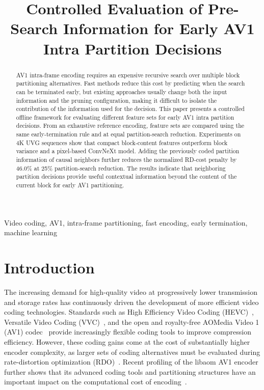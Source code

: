 \documentclass{article}
\title{Controlled Evaluation of Pre-Search Information for Early AV1 Intra Partition Decisions}
\begin{document}
\ninept

\maketitle

\begin{abstract}
AV1 intra-frame encoding requires an expensive recursive search over multiple block partitioning alternatives. Fast methods reduce this cost by predicting when the search can be terminated early, but existing approaches usually change both the input information and the pruning configuration, making it difficult to isolate the contribution of the information used for the decision. This paper presents a controlled offline framework for evaluating different feature sets for early AV1 intra partition decisions. From an exhaustive reference encoding, feature sets are compared using the same early-termination rule and at equal partition-search reduction. Experiments on 4K UVG sequences show that compact block-content features outperform block variance and a pixel-based ConvNeXt model. Adding the previously coded partition information of causal neighbors further reduces the normalized RD-cost penalty by 46.0\% at 25\% partition-search reduction. The results indicate that neighboring partition decisions provide useful contextual information beyond the content of the current block for early AV1 partitioning.
\end{abstract}

\begin{keywords}
Video coding, AV1, intra-frame partitioning, fast encoding, early termination,
machine learning
\end{keywords}

\section{Introduction}
\label{sec:intro}

The increasing demand for high-quality video at progressively lower transmission and storage rates has continuously driven the development of more efficient video coding technologies. Standards such as High Efficiency Video Coding (HEVC)~\cite{itut2013hevc}, Versatile Video Coding (VVC)~\cite{itut2020vvc}, and the open and royalty-free AOMedia Video 1 (AV1) codec~\cite{aomedia2019av1,han2021av1overview} provide increasingly flexible coding tools to improve compression efficiency. However, these coding gains come at the cost of substantially higher encoder complexity, as larger sets of coding alternatives must be evaluated during rate-distortion optimization (RDO)~\cite{sullivan1998rdoptimization,grois2016codingefficiency,layek2017encoderperformance}. Recent profiling of the libaom AV1 encoder further shows that its advanced coding tools and partitioning structures have an important impact on the computational cost of encoding~\cite{bender2023av1complexity}.
\end{document}
